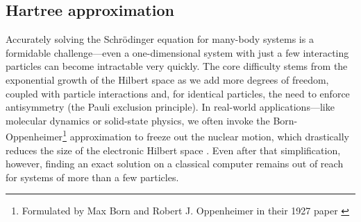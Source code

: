 \documentclass{subfiles}
\begin{document}



\subsection{Hartree approximation}\label{sec:hartree_theory}
Accurately solving the Schrödinger equation for many-body systems is a formidable challenge—even a one-dimensional system with just a few interacting particles can become intractable very quickly. The core difficulty stems from the exponential growth of the Hilbert space as we add more degrees of freedom, coupled with particle interactions and, for identical particles, the need to enforce antisymmetry (the Pauli exclusion principle). In real-world applications—like molecular dynamics or solid-state physics, we often invoke the Born-Oppenheimer\footnote{Formulated by Max Born and Robert J. Oppenheimer in their 1927 paper \cite{Born_Oppenheimer_1927}} approximation to freeze out the nuclear motion, which drastically reduces the size of the electronic Hilbert space \cite{helgaker2013molecular, szabo1996modern}. Even after that simplification, however, finding an exact solution on a classical computer remains out of reach for systems of more than a few particles.
\\ 
\end{document}
